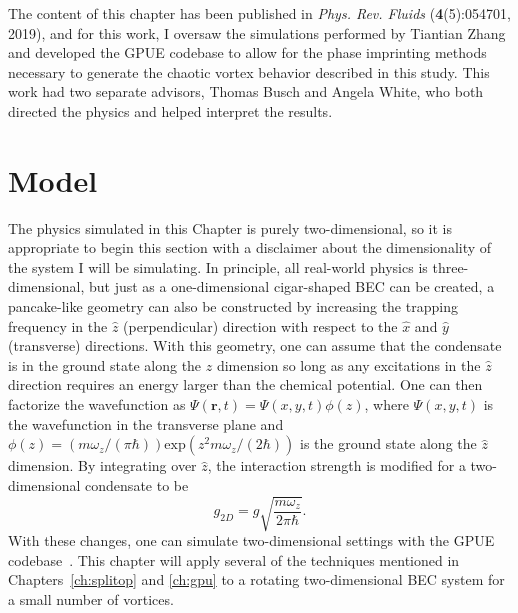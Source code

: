 The content of this chapter has been published in \textit{Phys. Rev. Fluids} (\textbf{4}(5):054701, 2019), and for this work, I oversaw the simulations performed by Tiantian Zhang and developed the GPUE codebase to allow for the phase imprinting methods necessary to generate the chaotic vortex behavior described in this study.
This work had two separate advisors, Thomas Busch and Angela White, who both directed the physics and helped interpret the results.

\section{Model}

The physics simulated in this Chapter is purely two-dimensional, so it is appropriate to begin this section with a disclaimer about the dimensionality of the system I will be simulating.
In principle, all real-world physics is three-dimensional, but just as a one-dimensional cigar-shaped BEC can be created, a pancake-like geometry can also be constructed by increasing the trapping frequency in the $\hat z$ (perpendicular) direction with respect to the $\hat x$ and $\hat y$ (transverse) directions.
With this geometry, one can assume that the condensate is in the ground state along the $\hat z$ dimension so long as any excitations in the $\hat z$ direction requires an energy larger than the chemical potential.
One can then factorize the wavefunction as $\Psi(\mathbf{r},t) = \Psi(x, y, t)\phi(z)$, where $\Psi(x, y, t)$ is the wavefunction in the transverse plane and $\phi(z) = (m \omega_z/(\pi\hbar))\text{exp}(z^2 m\omega_z/(2\hbar))$ is the ground state along the $\hat z$ dimension.
By integrating over $\hat z$, the interaction strength is modified for a two-dimensional condensate to be
\begin{equation}
g_{2D} = g \sqrt{\frac{m\omega_z}{2\pi\hbar}}.
\end{equation}
\noindent With these changes, one can simulate two-dimensional settings with the GPUE codebase~\cite{zhang2019, o2017, o2016topo, o2016}.
This chapter will apply several of the techniques mentioned in Chapters~\ref{ch:splitop} and \ref{ch:gpu} to a rotating two-dimensional BEC system for a small number of vortices.

